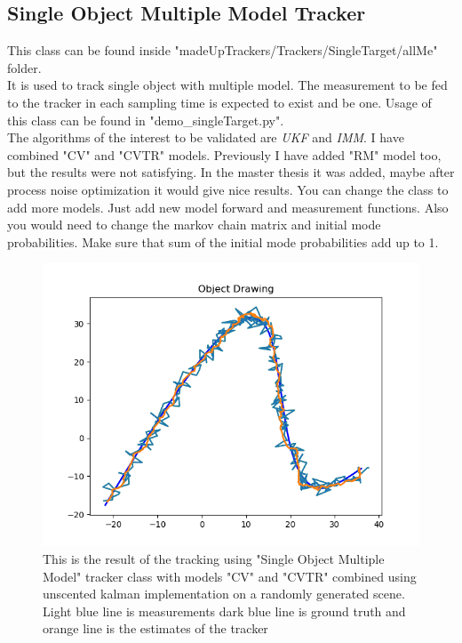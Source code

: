 \documentclass[peerreview]{IEEEtran}
\begin{document}
\subsection{Single Object Multiple Model Tracker}
This class can be found inside "madeUpTrackers/Trackers/SingleTarget/allMe" folder. \\

It is used to track single object with multiple model. The measurement to be fed to the tracker in each sampling time is expected to exist and be one. Usage of this class can be found in "demo\_singleTarget.py". \\

The algorithms of the interest to be validated are \emph{UKF} and \emph{IMM}. I have combined "CV" and "CVTR" models. Previously I have added "RM" model too, but the results were not satisfying. In the master thesis it was added, maybe after process noise optimization it would give nice results. You can change the class to add more models. Just add new model forward and measurement functions. Also you would need to change the markov chain matrix and initial mode probabilities. Make sure that sum of the initial mode probabilities add up to 1.

\begin{figure}[htbp]
\centerline{\includegraphics[scale=.5]{immPath_singleTarget.png}}
\caption{This is the result of the tracking using "Single Object Multiple Model" tracker class with models "CV" and "CVTR" combined using unscented kalman implementation on a randomly generated scene. Light blue line is measurements dark blue line is ground truth and orange line is the estimates of the tracker}
\label{fig}
\end{figure}
\end{document}
